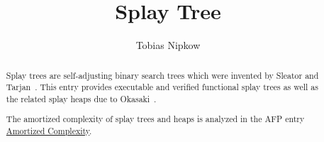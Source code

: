 \documentclass[11pt,a4paper]{article}
\begin{document}
\title{Splay Tree}
\author{Tobias Nipkow}
\maketitle

\begin{abstract}
Splay trees are self-adjusting binary search trees which were
invented by Sleator and Tarjan~\cite{SleatorT-JACM85}.
This entry provides executable and verified functional splay trees
as well as the related splay heaps due to Okasaki~\cite{Okasaki}.

The amortized complexity of splay trees and heaps is analyzed in the AFP entry
\href{http://isa-afp.org/entries/Amortized_Complexity.shtml}{Amortized Complexity}.
\end{abstract}

\tableofcontents
\bigskip





\end{document}

